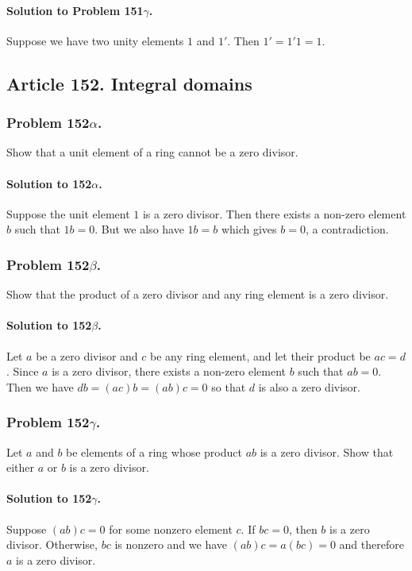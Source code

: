 \paragraph*{Solution to Problem 151$\gamma$.}
Suppose we have two unity elements $1 $ and $1'$. Then $ 1' = 1' 1 = 1$.

\subsection{Article 152. Integral domains}
\subsubsection{Problem 152$\alpha$.}
Show that a unit element of a ring cannot be a zero divisor.

\paragraph*{Solution to 152$\alpha$.}
Suppose the unit element $1$ is a zero divisor. Then there exists a non-zero
element $ b $ such that $ 1 b = 0$. But we also have $ 1 b = b$ which gives $ b
= 0$, a contradiction.

\subsubsection{Problem 152$\beta$.}
Show that the product of a zero divisor and any ring element is a zero divisor.

\paragraph*{Solution to 152$\beta$.}
Let $a$ be a zero divisor and $c$ be any ring element, and let their product be
$ ac = d$. Since $a$ is a zero divisor, there exists a non-zero element $b$
such that $ab = 0$. Then we have $ db = (ac)b = (ab)c = 0 $ so that $d$ is also
a zero divisor.

\subsubsection{Problem 152$\gamma$.}
Let $a$ and $b$ be elements of a ring whose product $ab$ is a zero divisor. Show
that either $a$ or $b$ is a zero divisor.

\paragraph*{Solution to 152$\gamma$.}
Suppose $(ab)c = 0$ for some nonzero element $c$. If $bc=0$,
then $b$ is a zero divisor. Otherwise, $bc$ is nonzero and we have
$(ab)c = a(bc) = 0$ and therefore $a$ is a zero divisor.


